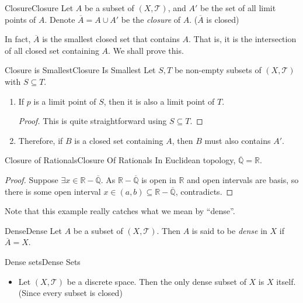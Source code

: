 \documentclass[../main.tex]{subfiles}
\begin{document}
\begin{definition}{Closure}{Closure}
Let $A$ be a subset of $(X,\mathcal{T})$, and $A'$ be the set of all limit points of $A$. Denote $\overline{A} = A\cup A'$ be the \emph{closure} of $A$. ($\overline{A}$ is closed)
\end{definition}
\begin{remark}
In fact, $\overline{A}$ is the smallest closed set that contains $A$. That is, it is the intersection of all closed set containing $A$. We shall prove this.
\end{remark}
\begin{proposition}{Closure is Smallest}{Closure Is Smallest}
Let $S,T$ be non-empty subsets of $(X,\mathcal{T})$ with $S \subseteq T$.
\begin{enumerate}
\item If $p$ is a limit point of $S$, then it is also a limit point of $T$.
	\begin{proof}
	This is quite straightforward using $S \subseteq T$.
	\end{proof}
\item Therefore, if $B$ is a closed set containing $A$, then $B$ must also contains $A'$.
\end{enumerate}
\end{proposition}

\begin{example}{Closure of Rationals}{Closure Of Rationals}
In Euclidean topology, $\overline{\mathbb{Q}} = \mathbb{R}$.
\begin{proof}
Suppose $\exists x\in \mathbb{R}-\overline{\mathbb{Q}}$. As $\mathbb{R}-\overline{\mathbb{Q}}$ is open in $\mathbb{R}$ and open intervals are basis, so there is some open interval $x\in (a,b) \subseteq \mathbb{R}-\overline{\mathbb{Q}}$, contradicts.
\end{proof}
\end{example}

Note that this example really catches what we mean by ``dense''.
\begin{definition}{Dense}{Dense}
Let $A$ be a subset of $(X,\mathcal{T})$. Then $A$ is said to be \emph{dense} in $X$ if $\overline{A} = X$.
\end{definition}
\begin{example}{Dense sets}{Dense Sets}
\begin{itemize}
\item Let $(X,\mathcal{T})$ be a discrete space. Then the only dense subset of $X$ is $X$ itself. (Since every subset is closed)
\end{itemize}
\end{example}
\end{document}
